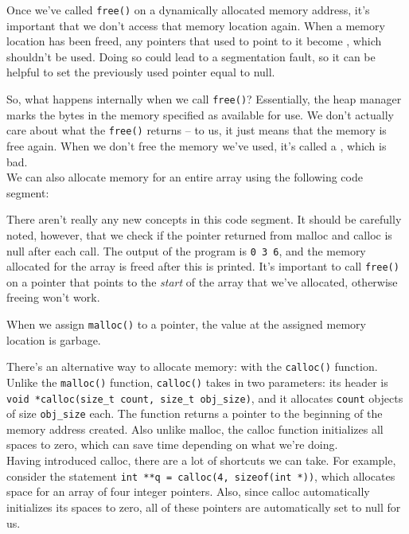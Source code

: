 Once we've called \verb!free()! on a dynamically allocated memory address, it's important that we don't access that memory location again. When a memory location has been freed, any pointers that used to point to it become , which shouldn't be used. Doing so could lead to a segmentation fault, so it can be helpful to set the previously used pointer equal to null.


So, what happens internally when we call \verb!free()!? Essentially, the heap manager marks the bytes in the memory specified as available for use. We don't actually care about what the \verb!free()! returns -- to us, it just means that the memory is free again. When we don't free the memory we've used, it's called a , which is bad. \\


We can also allocate memory for an entire array using the following code segment:



\begin{center}

\end{center}

There aren't really any new concepts in this code segment. It should be carefully noted, however, that we check if the pointer returned from malloc and calloc is null after each call. The output of the program is \texttt{0 3 6}, and the memory allocated for the array is freed after this is printed. It's important to call \verb!free()! on a pointer that points to the \textit{start} of the array that we've allocated, otherwise freeing won't work.



When we assign \verb!malloc()! to a pointer, the value at the assigned memory location is garbage. 




There's an alternative way to allocate memory: with the \verb!calloc()! function. Unlike the \verb!malloc()! function, \verb!calloc()! takes in two parameters: its header is \verb!void *calloc(size_t count, size_t obj_size)!, and it allocates \verb!count! objects of size \verb!obj_size! each. The function returns a pointer to the beginning of the memory address created. Also unlike malloc, the calloc function initializes all spaces to zero, which can save time depending on what we're doing. \\



Having introduced calloc, there are a lot of shortcuts we can take. For example, consider the statement \verb!int **q = calloc(4, sizeof(int *))!, which allocates space for an array of four integer pointers. Also, since calloc automatically initializes its spaces to zero, all of these pointers are automatically set to null for us. 